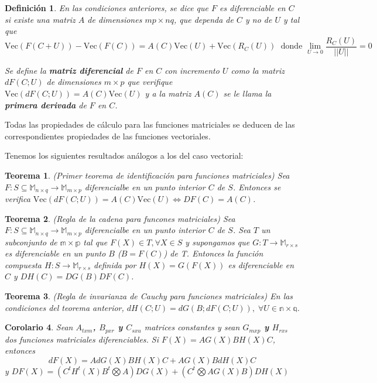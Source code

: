 \documentclass{article}
\theoremstyle{theorem-style}  %
\newtheorem{theorem}{Teorema}[section]  %
\newtheorem{corollary}[theorem]{Corolario} %
\theoremstyle{definition}
\newtheorem{definition}{Definición}[section]
\theoremstyle{example-style}
\begin{document}
\begin{definition}
\textit{	En las condiciones anteriores, se dice que $F$ es diferenciable en $C$ si existe una matriz $A$ de dimensiones $mp\times nq$, que dependa de $C$ y no de $U$ y tal que}
	$$\text{Vec}(F(C+U))-\text{Vec}(F(C))=A(C)\text{Vec}(U)+\text{Vec}(R_C(U))\; \text{ donde } \lim\limits_{U\rightarrow 0} \frac{R_C(U)}{||U||} = 0$$
	
	\textit{Se define la \textbf{matriz diferencial} de $F$ en $C$ con incremento $U$ como la matriz $dF(C;U)$ de dimensiones $m\times p$ que verifique $\text{Vec}(dF(C;U))=A(C)\text{Vec}(U)$ y a la matriz $A(C)$ se le llama la \textbf{primera derivada} de $F$ en $C$.}
\end{definition}

Todas las propiedades de cálculo para las funciones matriciales se deducen de las correspondientes propiedades de las funciones vectoriales.

Tenemos los siguientes resultados análogos a los del caso vectorial:

\begin{theorem} (Primer teorema de identificación para funciones matriciales)
	Sea $F:S\subseteq \mathbb{M}_{n \times q}\rightarrow \mathbb{M}_{m \times p}$ diferencialbe en un punto interior $C$ de $S$. Entonces se verifica $\text{Vec}(dF(C;U))=A(C)\text{Vec}(U) \Leftrightarrow DF(C)=A(C)$.	
\end{theorem}

\begin{theorem} (Regla de la cadena para funcones matriciales)
	Sea $F:S\subseteq \mathbb{M}_{n \times q}\rightarrow \mathbb{M}_{m \times p}$ diferencialbe en un punto interior $C$ de $S$. Sea $T$ un subconjunto de $\mathbb{m\times p}$ tal que $F(X)\in T, \forall X\in S$ y supongamos que $G:T\rightarrow \mathbb{M}_{r\times s}$ es diferenciable en un punto $B$ ($B=F(C)$) de T. Entonces la función compuesta $H:S\rightarrow \mathbb{M}_{r\times s}$ definida por $H(X)=G(F(X))$ es diferenciable en $C$ y $DH(C)=DG(B)DF(C)$.
\end{theorem}

\begin{theorem}(Regla de invarianza de Cauchy para funciones matriciales)
	En las condiciones del teorema anterior, $dH(C;U)=dG(B;dF(C;U)), \; \forall U\in \mathbb{n\times q}$.	
\end{theorem}

\begin{corollary}
	Sean \textbf{$A_{txm}$, $B_{pxr}$ y $C_{sxu}$} matrices constantes y sean \textbf{$G_{mxp}$ y $H_{rxs}$} dos funciones matriciales diferenciables. Si \textbf{$F(X) = AG(X)BH(X)C$}, entonces
	\textbf{$$ dF(X)= AdG(X)BH(X)C + AG(X)BdH(X)C $$}
	y \textbf{$DF(X)= (C^tH^t(X)B^t \bigotimes A)DG(X) + (C^t \bigotimes AG(X)B)DH(X)$} 
\end{corollary}
\end{document}
